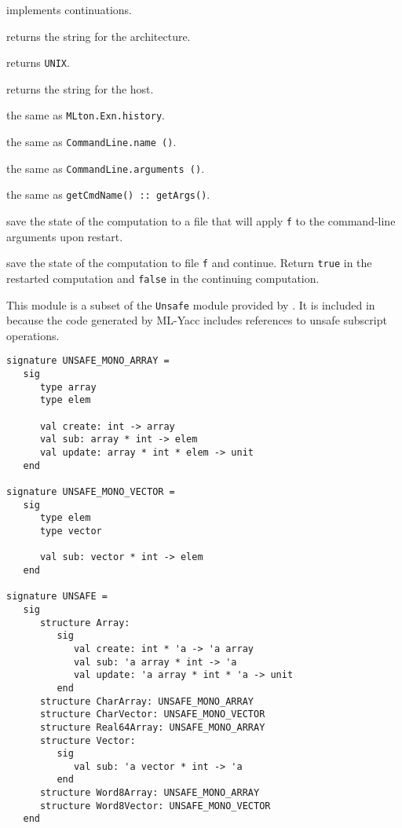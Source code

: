 \begin{description}

 implements continuations.

returns the string for the architecture.

returns {\tt UNIX}.

returns the string for the host.

the same as {\tt MLton.Exn.history}.

the same as {\tt CommandLine.name ()}.

the same as {\tt CommandLine.arguments ()}.

the same as {\tt getCmdName() :: getArgs()}.

save the state of the computation to a file that will apply {\tt f} to
the command-line arguments upon restart.

save the state of the computation to file {\tt f} and continue.
Return {\tt true} in the restarted computation and {\tt false} in the
continuing computation.

\end{description}
%

This module is a subset of the {\tt Unsafe} module provided by
{\smlnj}.  It is included in {\mlton} because the code generated by
ML-Yacc includes references to unsafe subscript operations.

\begin{verbatim}
signature UNSAFE_MONO_ARRAY =
   sig
      type array
      type elem

      val create: int -> array
      val sub: array * int -> elem
      val update: array * int * elem -> unit
   end

signature UNSAFE_MONO_VECTOR =
   sig
      type elem
      type vector

      val sub: vector * int -> elem
   end

signature UNSAFE =
   sig
      structure Array:
         sig
            val create: int * 'a -> 'a array
            val sub: 'a array * int -> 'a
            val update: 'a array * int * 'a -> unit
         end
      structure CharArray: UNSAFE_MONO_ARRAY
      structure CharVector: UNSAFE_MONO_VECTOR
      structure Real64Array: UNSAFE_MONO_ARRAY
      structure Vector:
         sig
            val sub: 'a vector * int -> 'a
         end
      structure Word8Array: UNSAFE_MONO_ARRAY
      structure Word8Vector: UNSAFE_MONO_VECTOR
   end
\end{verbatim}
